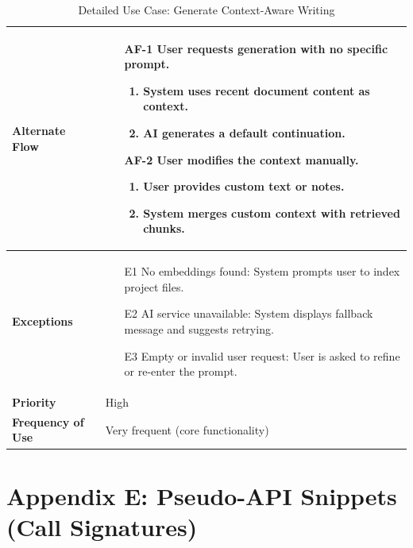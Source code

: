 \begin{table}[H]
\begin{tabular}{|p{3cm}|p{13cm}|}
\textbf{Alternate Flow} &
\begin{enumerate}
    \item[AF-1] User requests generation with no specific prompt.
    \begin{enumerate}
        \item System uses recent document content as context.
        \item AI generates a default continuation.
    \end{enumerate}
    \item[AF-2] User modifies the context manually.
    \begin{enumerate}
        \item User provides custom text or notes.
        \item System merges custom context with retrieved chunks.
    \end{enumerate}
\end{enumerate} \\ \hline

\textbf{Exceptions} &
\begin{enumerate}
    \item[E1] No embeddings found: System prompts user to index project files.
    \item[E2] AI service unavailable: System displays fallback message and suggests retrying.
    \item[E3] Empty or invalid user request: User is asked to refine or re-enter the prompt.
\end{enumerate} \\ \hline

\textbf{Priority} & High \\ \hline
\textbf{Frequency of Use} & Very frequent (core functionality) \\ \hline
\end{tabular}
\caption{Detailed Use Case: Generate Context-Aware Writing}
\label{tab:usecase-uc01}
\end{table}

\section{Appendix E: Pseudo-API Snippets (Call Signatures)}
\label{sec:appendix-e-pseudo-api}

